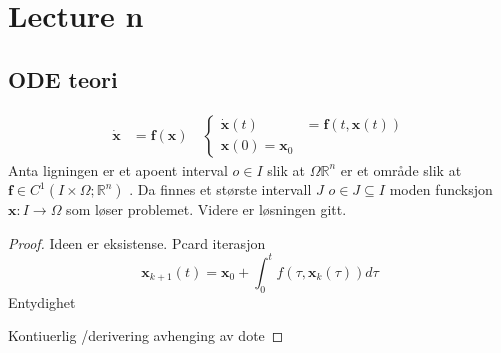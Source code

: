 \documentclass{article}
\newcommand{\incfig}[2][1]{%
\def\svgwidth{#1\columnwidth}
{#2.pdf_tex} } \pdfsuppresswarningpagegroup=1
\theoremstyle{remark}
\newcommand{\newpara}
  {
  \vskip 0.4cm
  }
\begin{document}



\newpage
\section{Lecture n}%
\label{sec:lecture_n}

\subsection{ODE teori}%
\label{sub:ode_teori}

\begin{theorem}
  \[
\begin{split}
  \mathbf{\dot{x}}  & = \mathbf{f} \left( \mathbf{x} \right) \quad  \begin{cases}
    \dot{\mathbf{x}} \left( t \right)    & = \mathbf{f} \left( t, \mathbf{x}\left( t \right) \right)  \\
    \mathbf{x}\left( 0 \right) = \mathbf{x}_{0}
  \end{cases} 
\end{split} 
  \] 
  Anta ligningen er et apoent interval $o \in I$ slik at $\Omega \mathbb{R} ^{n}$ er et område slik at $\mathbf{f} \in  C ^{1} \left( I \times  \Omega  ; \mathbb{R} ^{n}  \right)$
  . Da finnes et største intervall $J$ $o \in J \subseteq I $  moden funcksjon $\mathbf{x} : I \to  \Omega $ som løser problemet. Videre er løsningen gitt. 
\end{theorem}

\begin{proof}
  Ideen er eksistense. Pcard iterasjon \[
  \mathbf{x}_{k+1}\left( t \right) = \mathbf{x}_{0} + \int_{0}^{t}  f\left( \tau , \mathbf{x}_{k} \left( \tau \right)  \right)  d \tau
  \] 
  Entydighet  
  \newpara
  Kontiuerlig /derivering avhenging av dote
  \newpara

\end{proof}
\end{document}
